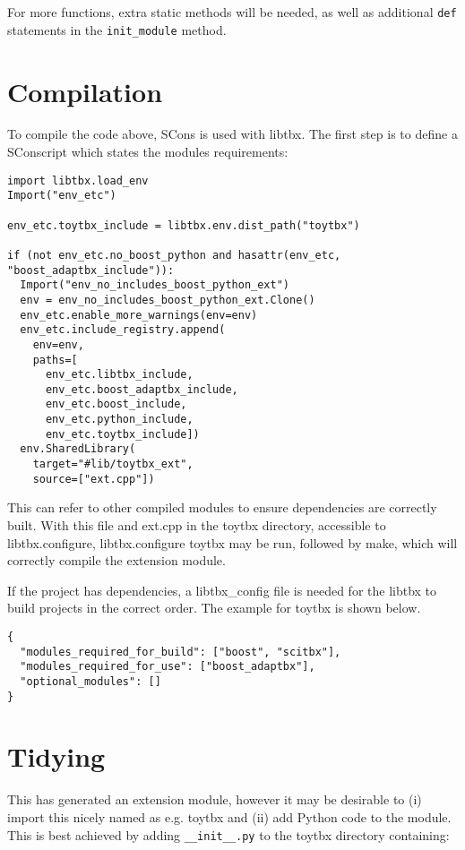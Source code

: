 \documentclass[a4paper, 11pt]{article}
\begin{document}
For more functions, extra static methods will be needed, as well as additional \verb|def| statements in the \verb|init_module| method.

\section{Compilation}

To compile the code above, SCons is used with libtbx. The first step is to define a SConscript which states the modules requirements:

{\small
\begin{verbatim}
import libtbx.load_env
Import("env_etc")

env_etc.toytbx_include = libtbx.env.dist_path("toytbx")

if (not env_etc.no_boost_python and hasattr(env_etc, "boost_adaptbx_include")):
  Import("env_no_includes_boost_python_ext")
  env = env_no_includes_boost_python_ext.Clone()
  env_etc.enable_more_warnings(env=env)
  env_etc.include_registry.append(
    env=env,
    paths=[
      env_etc.libtbx_include,
      env_etc.boost_adaptbx_include,
      env_etc.boost_include,
      env_etc.python_include,
      env_etc.toytbx_include])
  env.SharedLibrary(
    target="#lib/toytbx_ext",
    source=["ext.cpp"])
\end{verbatim}
}

This can refer to other compiled modules to ensure dependencies are correctly built. With this file and ext.cpp in the toytbx directory, accessible to libtbx.configure, libtbx.configure toytbx may be run, followed by make, which will correctly compile the extension module.

If the project has dependencies, a libtbx_config file is needed for the libtbx to build projects in the correct order. The example for toytbx is shown below.

{\small
\begin{verbatim}
{
  "modules_required_for_build": ["boost", "scitbx"],
  "modules_required_for_use": ["boost_adaptbx"],
  "optional_modules": []
}
\end{verbatim}
}

\section{Tidying}

This has generated an extension module, however it may be desirable to (i) import this nicely named as e.g. toytbx and (ii) add Python code to the module. This is best achieved by adding \verb|__init__.py| to the toytbx directory containing:
\end{document}
